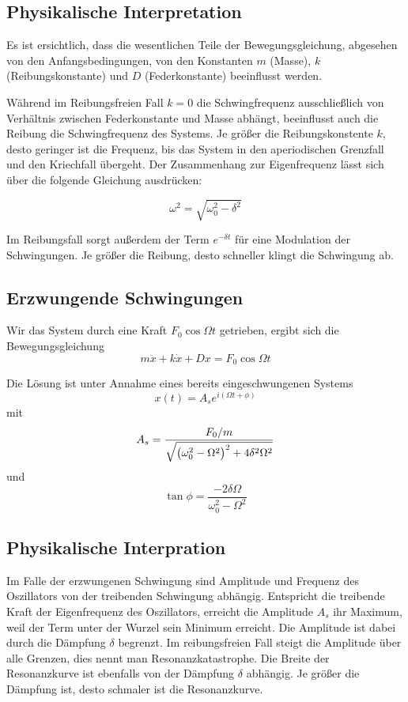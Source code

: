 \documentclass[a4paper,german,12pt,smallheadings]{scrartcl}
\begin{document}
\subsection{Physikalische Interpretation}
Es ist ersichtlich, dass die wesentlichen Teile der Bewegungsgleichung,
abgesehen von den Anfangsbedingungen, von den Konstanten $m$ (Masse), $k$
(Reibungskonstante) und $D$ (Federkonstante) beeinflusst werden.

Während im Reibungsfreien Fall $k=0$ die Schwingfrequenz ausschließlich von
Verhältnis zwischen Federkonstante und Masse abhängt, beeinflusst auch die
Reibung die Schwingfrequenz des Systems. Je größer die Reibungskonstente $k$,
desto geringer ist die Frequenz, bis das System in den aperiodischen Grenzfall
und den Kriechfall übergeht. Der Zusammenhang zur Eigenfrequenz lässt sich über
die folgende Gleichung ausdrücken:

\begin{equation}
  \omega^2 = \sqrt{\omega_0^2 - \delta^2}
  \label{eq:eigenfreq}
\end{equation}

Im Reibungsfall sorgt außerdem der Term $e^{- \delta t}$ für eine Modulation
der Schwingungen. Je größer die Reibung, desto schneller klingt die Schwingung
ab.

\subsection{Erzwungende Schwingungen}
Wir das System durch eine Kraft $F_0 \cos \Omega t$ getrieben, ergibt sich die
Bewegungsgleichung
\begin{equation}
  m \ddot{x} + k \dot{x} + D x = F_0 \cos \Omega t
\end{equation}

Die Lösung ist unter Annahme eines bereits eingeschwungenen Systems
\begin{equation}
  x(t) = A_s e^{i (\Omega t + \phi)}
\end{equation}
mit
\begin{equation}
  A_s = \frac{F_0 / m}{\sqrt{\del{\omega_0^2 - \Omega^2}^2 + 4 \delta^2 \Omega^2}}
  \label{eq:amp}
\end{equation}
und
\begin{equation}
  \tan \phi = \frac{- 2 \delta \Omega}{\omega_0^2 - \Omega^2}
  \label{eq:tan}
\end{equation}

\subsection{Physikalische Interpration}
Im Falle der erzwungenen Schwingung sind Amplitude und Frequenz des Oszillators
von der treibenden Schwingung abhängig. Entspricht die treibende Kraft der
Eigenfrequenz des Oszillators, erreicht die Amplitude $A_s$ ihr Maximum, weil
der Term unter der Wurzel sein Minimum erreicht. Die Amplitude ist dabei durch
die Dämpfung $\delta$ begrenzt. Im reibungsfreien Fall steigt die Amplitude
über alle Grenzen, dies nennt man Resonanzkatastrophe. Die Breite der
Resonanzkurve ist ebenfalls von der Dämpfung $\delta$ abhängig. Je größer die
Dämpfung ist, desto schmaler ist die Resonanzkurve.
\end{document}
